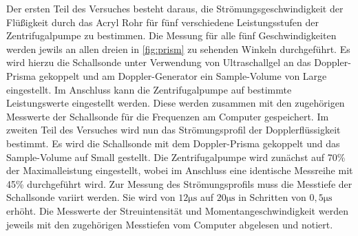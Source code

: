 Der ersten Teil des Versuches besteht daraus, die Strömungsgeschwindigkeit der Flüßigkeit durch das Acryl Rohr für fünf verschiedene Leistungsstufen der Zentrifugalpumpe zu
bestimmen. Die Messung für alle fünf Geschwindigkeiten werden jewils an allen dreien in \autoref{fig:prism} zu sehenden Winkeln durchgeführt.
\newline
Es wird hierzu die Schallsonde unter Verwendung von Ultraschallgel an das Doppler-Prisma gekoppelt und am Doppler-Generator ein Sample-Volume von Large eingestellt. Im
Anschluss kann die Zentrifugalpumpe auf bestimmte Leistungswerte eingestellt werden. Diese werden zusammen mit den zugehörigen Messwerte der Schallsonde für die Frequenzen
am Computer gespeichert.
\newline\newline
Im zweiten Teil des Versuches wird nun das Strömungsprofil der Dopplerflüssigkeit bestimmt. Es wird die Schallsonde mit dem Doppler-Prisma gekoppelt und das Sample-Volume
auf Small gestellt. Die Zentrifugalpumpe wird zunächst auf 70\% der Maximalleistung eingestellt, wobei im Anschluss eine identische Messreihe mit 45\% durchgeführt
wird.
\newline
Zur Messung des Strömungsprofils muss die Messtiefe der Schallsonde variirt werden. Sie wird von $12\si{\micro\s}$ auf $20\si{\micro\s}$ in Schritten
von $0,5\si{\micro\s}$ erhöht. Die Messwerte der Streuintensität und Momentangeschwindigkeit werden jeweils mit den zugehörigen Messtiefen vom Computer abgelesen und
notiert.